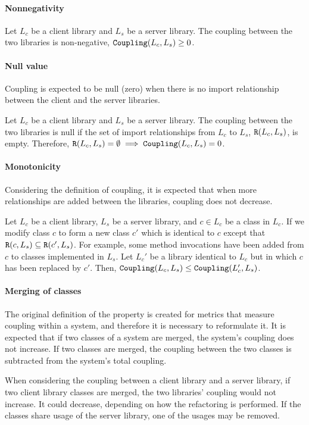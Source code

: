 \paragraph{Nonnegativity}

Let $L_c$ be a client library and $L_s$ be a server library. The coupling between the two libraries is non-negative, $\verb|Coupling|(L_c, L_s) \ge 0$.

\paragraph{Null value}
Coupling is expected to be null (zero) when there is no import relationship between the client and the server libraries.

Let $L_c$ be a client library and $L_s$ be a server library. The coupling between the two libraries is null if the set of import relationships from $L_c$ to $L_s$, $\verb|R|(L_c, L_s)$, is empty. Therefore, $\verb|R|(L_c, L_s) = \emptyset \implies \verb|Coupling|(L_c, L_s) = 0$.

\paragraph{Monotonicity}
Considering the definition of coupling, it is expected that when more relationships are added between the libraries, coupling does not decrease.

Let $L_c$ be a client library, $L_s$ be a server library, and $c \in L_c$ be a class in $L_c$. If we modify class $c$ to form a new class $c'$ which is identical to $c$ except that $\verb|R|(c, L_s) \subseteq \verb|R|(c', L_s)$. For example, some method invocations have been added from $c$ to classes implemented in $L_s$. Let $L_c'$ be a library identical to $L_c$ but in which $c$ has been replaced by $c'$. Then, $\verb|Coupling|(L_c, L_s) \le \verb|Coupling|(L_c', L_s)$.

\paragraph{Merging of classes}
The original definition of the property is created for metrics that measure coupling within a system, and therefore it is necessary to reformulate it. It is expected that if two classes of a system are merged, the system's coupling does not increase. If two classes are merged, the coupling between the two classes is subtracted from the system's total coupling.

When considering the coupling between a client library and a server library, if two client library classes are merged, the two libraries' coupling would not increase. It could decrease, depending on how the refactoring is performed. If the classes share usage of the server library, one of the usages may be removed.

